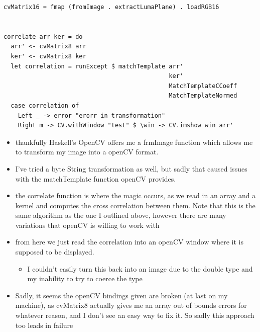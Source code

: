 \documentclass{article}
\begin{document}
\begin{enumerate}
\begin{itemize}
\begin{verbatim}
cvMatrix16 = fmap (fromImage . extractLumaPlane) . loadRGB16


correlate arr ker = do
  arr' <- cvMatrix8 arr
  ker' <- cvMatrix8 ker
  let correlation = runExcept $ matchTemplate arr'
                                              ker' 
                                              MatchTemplateCCoeff
                                              MatchTemplateNormed
  case correlation of
    Left _ -> error "erorr in transformation"
    Right m -> CV.withWindow "test" $ \win -> CV.imshow win arr'
\end{verbatim}
\begin{itemize}
\item thankfully Haskell's OpenCV offers me a frmImage function which
allows me to transform my image into a openCV format.
\item I've tried a byte String transformation as well, but sadly that
caused issues with the matchTemplate function openCV provides.
\item the correlate function is where the magic occurs, as we read in an
array and a kernel and computes the cross correlation between
them. Note that this is the same algorithm as the one I outlined
above, however there are many variations that openCV is willing to
work with
\item from here we just read the correlation into an openCV window where
it is supposed to be displayed.
\begin{itemize}
\item I couldn't easily turn this back into an image due to the double
type and my inability to try to coerce the type
\end{itemize}
\item Sadly, it seems the openCV bindings given are broken (at last on
my machine), as cvMatrix8 actually gives me an array out of bounds
errors for whatever reason, and Ι don't see an easy way to fix
it. So sadly this approach too leads in failure
\end{itemize}
\end{itemize}
\end{enumerate}
\end{document}
